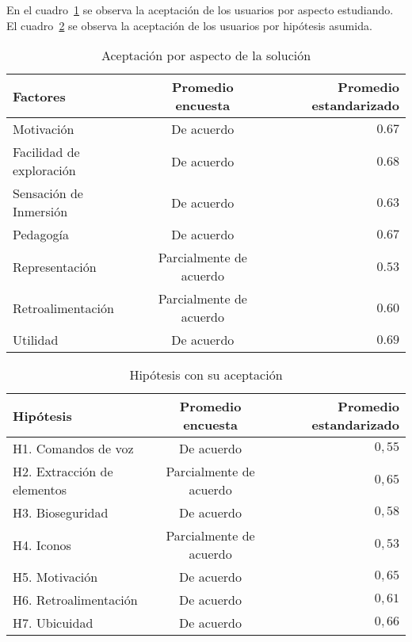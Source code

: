 En el cuadro~\ref{tab:resultado_resumen_aspectos_aceptacion} se observa 
la aceptación de los usuarios por aspecto estudiando. El 
cuadro~\ref{tab:resultado_resumen_hipotesis} se observa la aceptación
de los usuarios por hipótesis asumida.  

\begin{table}
\centering
\caption{Aceptación por aspecto de la solución}
\begin{tabular}{lcr}
\toprule
Factores        & Promedio encuesta      & Promedio estandarizado \\
\midrule
Motivación               & De acuerdo              & $0.67$  \\
Facilidad de exploración & De acuerdo              & $0.68$  \\
Sensación de Inmersión   & De acuerdo              & $0.63$  \\
Pedagogía                & De acuerdo              & $0.67$  \\
Representación           & Parcialmente de acuerdo & $0.53$  \\
Retroalimentación        & Parcialmente de acuerdo & $0.60$  \\
Utilidad                 & De acuerdo              & $0.69$  \\
\bottomrule
\end{tabular}
\label{tab:resultado_resumen_aspectos_aceptacion}
\end{table}



\begin{table}
\centering
\caption{Hipótesis con su aceptación}
\begin{tabular}{lcr}
\toprule
Hipótesis                   & Promedio encuesta     & Promedio estandarizado \\
\midrule
H1. Comandos de voz         & De acuerdo              & $0,55$ \\
H2. Extracción de elementos & Parcialmente de acuerdo & $0,65$ \\
H3. Bioseguridad            & De acuerdo              & $0,58$ \\
H4. Iconos                  & Parcialmente de acuerdo & $0,53$ \\
H5. Motivación              & De acuerdo              & $0,65$ \\
H6. Retroalimentación       & De acuerdo              & $0,61$ \\
H7. Ubicuidad               & De acuerdo              & $0,66$ \\
\bottomrule
\end{tabular}
\label{tab:resultado_resumen_hipotesis}
\end{table}



